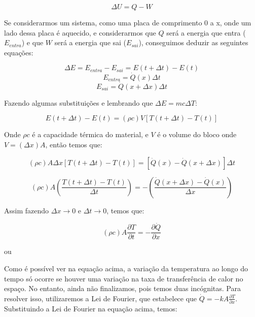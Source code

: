 \documentclass[final,5p,times,twocolumn]{elsarticle}
\begin{document}
\begin{equation*}
    \Delta U = Q - W
\end{equation*}

Se considerarmos um sistema, como uma placa de comprimento 0 a x, onde um lado dessa placa é aquecido, e considerarmos que $Q$ será a energia que entra ($E_{entra}$) e que $W$ será a energia que sai ($E_{sai}$), conseguimos deduzir as seguintes equações:

\begin{equation*}
    \Delta E = E_{entra} - E_{sai} = E(t + \Delta t) - E(t)
\end{equation*}
\begin{equation*}
    E_{entra} = \dot{Q}(x)\Delta t
\end{equation*}
\begin{equation*}
    E_{sai} = \dot{Q}(x + \Delta x)\Delta t
\end{equation*}

Fazendo algumas substituições e lembrando que $\Delta E = mc\Delta T$:

\begin{equation*}
    E(t + \Delta t) - E(t) = (\rho c)V[T(t + \Delta t) - T(t)]
\end{equation*}

Onde $\rho c$ é a capacidade térmica do material, e $V$ é o volume do bloco onde $V = (\Delta x)A$, então temos que:

\begin{equation*}
    (\rho c)A\Delta x[T(t + \Delta t) - T(t)] = [\dot{Q}(x) - \dot{Q}(x + \Delta x)]\Delta t
\end{equation*}

\begin{equation*}
    (\rho c)A(\frac{T(t + \Delta t) - T(t)}{\Delta t}) = -(\frac{\dot{Q}(x + \Delta x) - \dot{Q}(x)}{\Delta x})
\end{equation*}

Assim fazendo $\Delta x \rightarrow 0$ e $\Delta t \rightarrow 0$, temos que:

\begin{equation*}
    (\rho c)A\frac{\partial T}{\partial t} = -\frac{\partial \dot{Q}}{\partial x}
\end{equation*}

ou

Como é possível ver na equação acima, a variação da temperatura ao longo do tempo só ocorre se houver uma variação na taxa de transferência de calor no espaço. No entanto, ainda não finalizamos, pois temos duas incógnitas. Para resolver isso, utilizaremos a Lei de Fourier, que estabelece que $\dot{Q} = -kA\frac{\partial T}{\partial x}$. Substituindo a Lei de Fourier na equação acima, temos:
\end{document}
